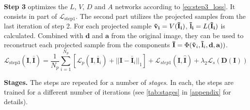 \textbf{Step 3} optimizes the $L$, $V$, $D$ and $A$ networks according to \autoref{eq:step3_loss}. It consists in part of $\mathcal{L}_{\textrm{step1}}$. The second part utilizes the projected samples from the last iteration of step 2. For each projected sample $\mathbf{\Tilde{v}_i}=V(\mathbf{\Tilde{I}_i})$, $\mathbf{\Tilde{l}_i}=L(\mathbf{\Tilde{I}_i})$ is calculated. Combined with $\mathbf{d}$ and  $\mathbf{a}$ from the original image, they can be used to reconstruct each projected sample from the components  $\mathbf{\bar{I}} = \Phi(\mathbf{\Tilde{v}}_i, \mathbf{\Tilde{l}}_i,  \mathbf{d}, \mathbf{a}))$.
\begin{equation}
    \mathcal{L}_{\textrm{step3}}(\mathbf{I}, \bar{\mathbf{I}})
    = \frac{1}{N_p} \sum_{i=1}^{N_p} [\mathcal{L}_p (\mathbf{I}, \mathbf{\bar{I}}_i ) + ||\mathbf{I} - \mathbf{\bar{I}}_i ||_1]  + \mathcal{L}_{step1}(\mathbf{I}, \mathbf{\hat{I}}) + \lambda_2 \mathcal{L}_{s}(\mathbf{D(\mathbf{I})})
    \label{eq:step3_loss}
\end{equation}

\textbf{Stages.} The steps are repeated for a number of \textit{stages}. In each, the steps are trained for a different number of iterations (see \autoref{tab:stages} in \autoref{appendix} for details).

